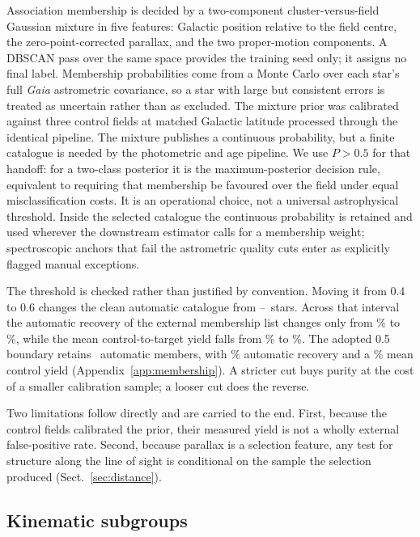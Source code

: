 \documentclass{aa}
\begin{document}
Association membership is decided by a two-component cluster-versus-field
Gaussian mixture in five features: Galactic position relative to the field
centre, the zero-point-corrected parallax, and the two proper-motion components.
A DBSCAN pass over the same space provides the training seed only; it assigns no
final label. Membership probabilities come from a Monte Carlo over each star's
full \textit{Gaia} astrometric covariance, so a star with large but consistent
errors is treated as uncertain rather than as excluded. The mixture prior was
calibrated against three control fields at matched Galactic latitude processed
through the identical pipeline. The mixture publishes a continuous probability,
but a finite catalogue is needed by the photometric and age pipeline. We use
$P>0.5$ for that handoff: for a two-class posterior it is the maximum-posterior
decision rule, equivalent to requiring that membership be favoured over the
field under equal misclassification costs. It is an operational choice, not a
universal astrophysical threshold. Inside the selected catalogue the continuous
probability is retained and used wherever the downstream estimator calls for a
membership weight; spectroscopic anchors that fail the astrometric quality cuts
enter as explicitly flagged manual exceptions.

The threshold is checked rather than justified by convention. Moving it from
0.4 to 0.6 changes the clean automatic catalogue from
\thresholdMembersLow--\thresholdMembersHigh\ stars. Across that interval the
automatic recovery of the external membership list changes only from
\thresholdRecallLow\% to \thresholdRecallHigh\%, while the mean control-to-target
yield falls from \thresholdControlLow\% to \thresholdControlHigh\%. The adopted
0.5 boundary retains \thresholdMembersAdopted\ automatic members, with
\thresholdRecallAdopted\% automatic recovery and a \thresholdControlAdopted\%
mean control yield (Appendix~\ref{app:membership}). A stricter cut buys purity at
the cost of a smaller calibration sample; a looser cut does the reverse.

Two limitations follow directly and are carried to the end. First, because the
control fields calibrated the prior, their measured yield is not a wholly
external false-positive rate. Second, because parallax is a selection feature,
any test for structure along the line of sight is conditional on the sample the
selection produced (Sect.~\ref{sec:distance}).

\subsection{Kinematic subgroups}\label{sec:subgroups}
\end{document}
